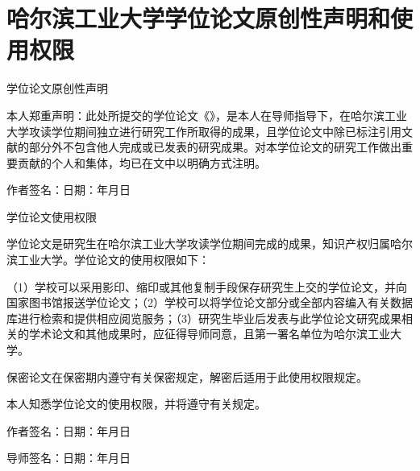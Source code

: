 \chapter*{哈尔滨工业大学学位论文原创性声明和使用权限}
{}

\vspace{\baselineskip}
\begin{center}{\xiaosan \heiti 学位论文原创性声明}\end{center}
\vspace{1em}

本人郑重声明：此处所提交的学位论文《\ctitle》，是本人在导师指导下，在哈尔滨工业大学攻读学位期间独立进行研究工作所取得的成果，且学位论文中除已标注引用文献的部分外不包含他人完成或已发表的研究成果。对本学位论文的研究工作做出重要贡献的个人和集体，均已在文中以明确方式注明。

\vspace{\baselineskip}
\hspace{6em}作者签名：\hfill 日期：\hspace{2.5em}年\hspace{1.5em}月\hspace{1.5em}日

\vspace{2\baselineskip}
\begin{center}{\xiaosan \heiti 学位论文使用权限}\end{center}
\vspace{1em}

学位论文是研究生在哈尔滨工业大学攻读学位期间完成的成果，知识产权归属哈尔滨工业大学。学位论文的使用权限如下：

（1）学校可以采用影印、缩印或其他复制手段保存研究生上交的学位论文，并向国家图书馆报送学位论文；（2）学校可以将学位论文部分或全部内容编入有关数据库进行检索和提供相应阅览服务；（3）研究生毕业后发表与此学位论文研究成果相关的学术论文和其他成果时，应征得导师同意，且第一署名单位为哈尔滨工业大学。

保密论文在保密期内遵守有关保密规定，解密后适用于此使用权限规定。

本人知悉学位论文的使用权限，并将遵守有关规定。

\vspace{2\baselineskip}
\hspace{6em}作者签名：\hfill 日期：\hspace{2.5em}年\hspace{1.5em}月\hspace{1.5em}日

\vspace{2\baselineskip}
\hspace{6em}导师签名：\hfill 日期：\hspace{2.5em}年\hspace{1.5em}月\hspace{1.5em}日
